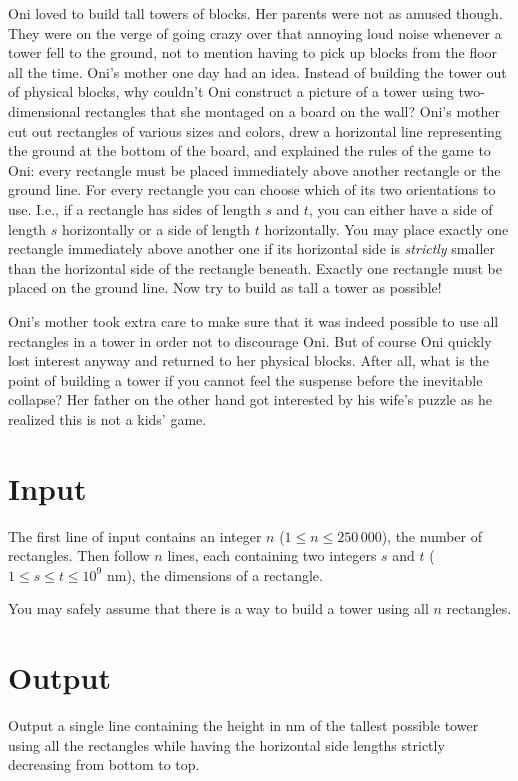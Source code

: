 
%
\noindent
Oni loved to build tall towers of blocks. Her parents were not as amused though. They were on the verge of going crazy over that annoying loud noise whenever a tower fell to the ground, not to mention having to pick up blocks from the floor all the time. Oni's mother one day had an idea. Instead of building the tower out of physical blocks, why couldn't Oni construct a picture of a tower using two-dimensional rectangles that she montaged on a board on the wall? Oni's mother cut out rectangles of various sizes and colors, drew a horizontal line representing the ground at the bottom of the board, and explained the rules of the game to Oni: 
every rectangle must be placed immediately above another rectangle or the ground line. For every rectangle you can choose which of its two orientations to use.  I.e., if a rectangle has sides of length $s$ and $t$, you can either have a side of length $s$ horizontally or a side of length $t$ horizontally. You may place exactly one rectangle immediately above another one if its horizontal side is \emph{strictly} smaller than the horizontal side of the rectangle beneath. Exactly one rectangle must be placed on the ground line. Now try to build as tall a tower as possible!

Oni's mother took extra care to make sure that it was indeed possible to use all rectangles in a tower in order not to discourage Oni.  But
of course Oni quickly lost interest anyway and returned to her physical blocks. After all, what is the point of building a tower if you cannot feel the suspense before the inevitable collapse? Her father on the other hand got interested by his wife's puzzle as he realized this is not a kids' game.

\section*{Input}

The first line of input contains an integer $n$ ($1 \le n \le 250\,000$), the number of rectangles. Then follow $n$ lines, each containing two integers $s$ and $t$ ($1 \le s \le t \le 10^9$ nm), the dimensions of a rectangle.

You may safely assume that there is a way to build a tower using all
$n$ rectangles.

\section*{Output}

Output a single line containing the height in nm of the tallest possible tower using all the rectangles while having the horizontal side lengths strictly decreasing from bottom to top.
